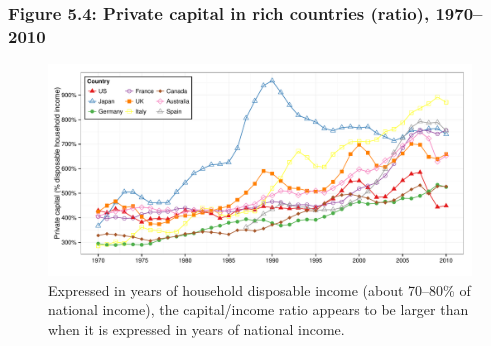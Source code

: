 \documentclass[t]{beamer}\usepackage[]{graphicx}\usepackage[]{color}
\newenvironment{knitrout}{}{} %
\begin{document}
\begin{frame}[label=Figure54]
\frametitle{Figure 5.4: Private capital in rich countries (ratio), 1970--2010}
\begin{figure}[t]
\begin{minipage}[b]{\textwidth}
\centering
\begin{knitrout}\footnotesize
{}\color{fgcolor}

{\centering \includegraphics[width=1\linewidth]{figures/color/Figure_5_4} 

}



\end{knitrout}
\caption{Expressed in years of household disposable income (about 70--80\% of national income), the capital/income ratio appears to be larger than when it is expressed in years of national income.}
\end{minipage}
\end{figure}
\end{frame}
\end{document}
